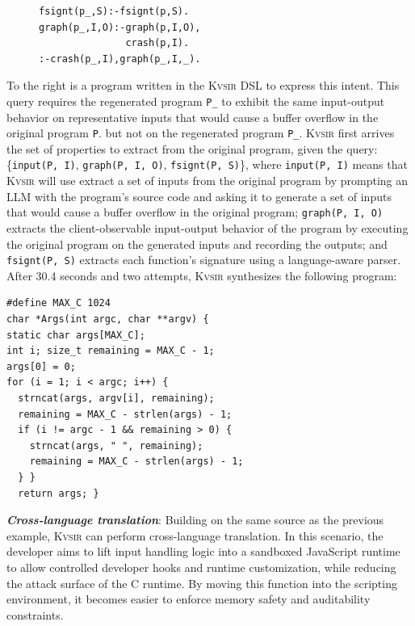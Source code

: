 \documentclass[sigplan,review,anonymous,10pt]{acmart}
\newcommand{\sys}{{\scshape Kv{\textalpha}sir}\xspace}
\newcommand{\heading}[1]{\vspace{2pt}\noindent\textbf{\emph{#1}}:\enspace}
\newcommand{\ttt}[1]{\texttt{#1}\xspace}
\newcommand{\prop}[1]{\setlength{\fboxsep}{1.75pt}\colorbox{lightperiwinkle}{\texttt{#1}}}
\begin{document}
\begin{figure}
\begin{verbatim}
fsignt(p_,S):-fsignt(p,S).
graph(p_,I,O):-graph(p,I,O),
               crash(p,I).
:-crash(p_,I),graph(p_,I,_).
\end{verbatim}
\end{figure}
To the right is a program written in the \sys DSL to express this intent.
This query requires the regenerated program \ttt{P\_} to exhibit the same
input-output behavior on representative inputs that would cause a buffer overflow in the original program \ttt{P}.
but not on the regenerated program \ttt{P\_}.
\sys first arrives the set of properties to extract from the
original program, given the query:
\{\prop{input(P, I)}, \prop{graph(P, I, O)}, \prop{fsignt(P, S)}\}, where
\prop{input(P, I)} means that \sys will use extract a set of inputs from the original program
by prompting an LLM with the program's source code and asking it to generate a set of inputs that
would cause a buffer overflow in the original program;
\prop{graph(P, I, O)} extracts the client-observable input-output behavior of the program
by executing the original program on the generated inputs and recording the outputs;
and \prop{fsignt(P, S)} extracts each function's signature using a language-aware parser.
After 30.4 seconds and two attempts, \sys synthesizes the following program:
\begin{verbatim}
#define MAX_C 1024
char *Args(int argc, char **argv) {
static char args[MAX_C];
int i; size_t remaining = MAX_C - 1;
args[0] = 0;
for (i = 1; i < argc; i++) {
  strncat(args, argv[i], remaining);
  remaining = MAX_C - strlen(args) - 1;
  if (i != argc - 1 && remaining > 0) {
    strncat(args, " ", remaining);
    remaining = MAX_C - strlen(args) - 1;
  } }
  return args; }
\end{verbatim}

\heading{Cross-language translation}
Building on the same source as the previous example, \sys can perform
cross-language translation.
In this scenario, the developer aims to lift input
handling logic into a sandboxed JavaScript runtime to allow controlled
developer hooks and runtime customization, while reducing the attack surface of
the C runtime.
By moving this function into the scripting environment, it
becomes easier to enforce memory safety and auditability constraints.
\end{document}
